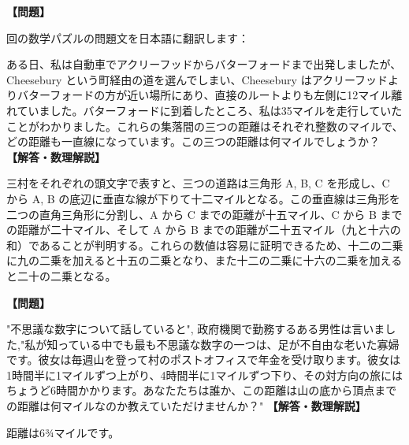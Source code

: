 \documentclass[10pt,a4paper,oneside,openany]{ltjsbook}
\begin{document}
\begin{tcolorbox}[colback=softblue,colframe=primaryblue,title=\textbf{第 69 問：THE THREE VILLAGES.},arc=2mm,boxrule=1pt,breakable]
\textbf{【問題】}\par\vspace{0.3em}
回の数学パズルの問題文を日本語に翻訳します：

ある日、私は自動車でアクリーフッドからバターフォードまで出発しましたが、 Cheesebury という町経由の道を選んでしまい、Cheesebury はアクリーフッドよりバターフォードの方が近い場所にあり、直接のルートよりも左側に12マイル離れていました。バターフォードに到着したところ、私は35マイルを走行していたことがわかりました。これらの集落間の三つの距離はそれぞれ整数のマイルで、どの距離も一直線になっています。この三つの距離は何マイルでしょうか？
\tcblower
\textbf{【解答・数理解説】}\par\vspace{0.3em}
三村をそれぞれの頭文字で表すと、三つの道路は三角形 A, B, C を形成し、C から A, B の底辺に垂直な線が下りて十二マイルとなる。この垂直線は三角形を二つの直角三角形に分割し、A から C までの距離が十五マイル、C から B までの距離が二十マイル、そして A から B までの距離が二十五マイル（九と十六の和）であることが判明する。これらの数値は容易に証明できるため、十二の二乗に九の二乗を加えると十五の二乗となり、また十二の二乗に十六の二乗を加えると二十の二乗となる。
\end{tcolorbox}

\begin{tcolorbox}[colback=softblue,colframe=primaryblue,title=\textbf{第 70 問：年金を引き取る （原題: DRAWING HER PENSION.）},arc=2mm,boxrule=1pt,breakable]
\textbf{【問題】}\par\vspace{0.3em}
"不思議な数字について話していると", 政府機関で勤務するある男性は言いました,"私が知っている中でも最も不思議な数字の一つは、足が不自由な老いた寡婦です。彼女は毎週山を登って村のポストオフィスで年金を受け取ります。彼女は1時間半に1マイルずつ上がり、4時間半に1マイルずつ下り、その対方向の旅にはちょうど6時間かかります。あなたたちは誰か、この距離は山の底から頂点までの距離は何マイルなのか教えていただけませんか？"
\tcblower
\textbf{【解答・数理解説】}\par\vspace{0.3em}
距離は6¾マイルです。
\end{tcolorbox}
\end{document}
